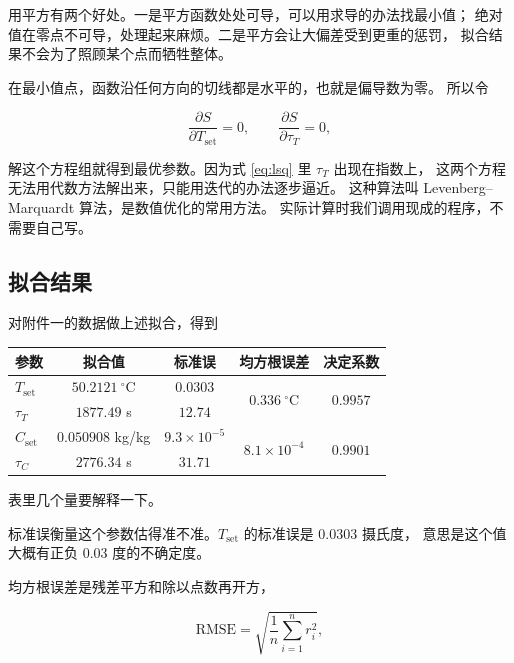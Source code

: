 用平方有两个好处。一是平方函数处处可导，可以用求导的办法找最小值；
绝对值在零点不可导，处理起来麻烦。二是平方会让大偏差受到更重的惩罚，
拟合结果不会为了照顾某个点而牺牲整体。

在最小值点，函数沿任何方向的切线都是水平的，也就是偏导数为零。
所以令

\begin{equation}
\frac{\partial S}{\partial T_{\mathrm{set}}}=0,\qquad
\frac{\partial S}{\partial \tau_T}=0,
\end{equation}

解这个方程组就得到最优参数。因为式 \eqref{eq:lsq} 里 $\tau_T$ 出现在指数上，
这两个方程无法用代数方法解出来，只能用迭代的办法逐步逼近。
这种算法叫 Levenberg–Marquardt 算法，是数值优化的常用方法。
实际计算时我们调用现成的程序，不需要自己写。

\subsection{拟合结果}

对附件一的数据做上述拟合，得到

\begin{center}
\begin{tabular}{@{}lcccc@{}}
\toprule
参数 & 拟合值 & 标准误 & 均方根误差 & 决定系数 \\
\midrule
$T_{\mathrm{set}}$ & $50.2121\ ^\circ$C & $0.0303$ & \multirow{2}{*}{$0.336\ ^\circ$C} & \multirow{2}{*}{$0.9957$} \\
$\tau_T$ & $1877.49$ s & $12.74$ & & \\
$C_{\mathrm{set}}$ & $0.050908$ kg/kg & $9.3\times10^{-5}$ & \multirow{2}{*}{$8.1\times10^{-4}$} & \multirow{2}{*}{$0.9901$} \\
$\tau_C$ & $2776.34$ s & $31.71$ & & \\
\bottomrule
\end{tabular}
\end{center}

表里几个量要解释一下。

标准误衡量这个参数估得准不准。$T_{\mathrm{set}}$ 的标准误是 $0.0303$ 摄氏度，
意思是这个值大概有正负 $0.03$ 度的不确定度。

均方根误差是残差平方和除以点数再开方，

\begin{equation}
\mathrm{RMSE}=\sqrt{\frac{1}{n}\sum_{i=1}^{n}r_i^2},
\end{equation}

